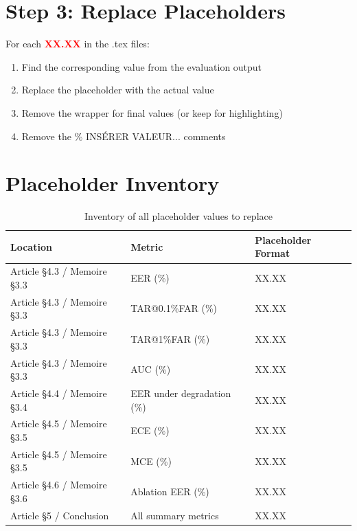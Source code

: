 \documentclass[11pt,a4paper]{article}
\begin{document}
\section{Step 3: Replace Placeholders}
For each \textcolor{red}{\textbf{XX.XX}} in the .tex files:
\begin{enumerate}
\item Find the corresponding value from the evaluation output
\item Replace the placeholder with the actual value
\item Remove the \textcolor{red}{} wrapper for final values (or keep for highlighting)
\item Remove the \% INS\'ERER VALEUR... comments
\end{enumerate}

\section{Placeholder Inventory}
\begin{table}[h]
\centering
\begin{tabular}{lll}
\toprule
Location & Metric & Placeholder Format \\
\midrule
Article \S4.3 / Memoire \S3.3 & EER (\%) & XX.XX \\
Article \S4.3 / Memoire \S3.3 & TAR@0.1\%FAR (\%) & XX.XX \\
Article \S4.3 / Memoire \S3.3 & TAR@1\%FAR (\%) & XX.XX \\
Article \S4.3 / Memoire \S3.3 & AUC (\%) & XX.XX \\
Article \S4.4 / Memoire \S3.4 & EER under degradation (\%) & XX.XX \\
Article \S4.5 / Memoire \S3.5 & ECE (\%) & XX.XX \\
Article \S4.5 / Memoire \S3.5 & MCE (\%) & XX.XX \\
Article \S4.6 / Memoire \S3.6 & Ablation EER (\%) & XX.XX \\
Article \S5 / Conclusion & All summary metrics & XX.XX \\
\bottomrule
\end{tabular}
\caption{Inventory of all placeholder values to replace}
\end{table}
\end{document}
